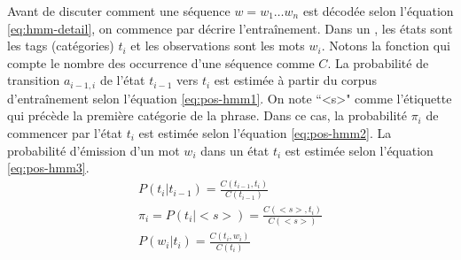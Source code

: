 \documentclass{KodeBook}
\begin{document}
Avant de discuter comment une séquence $w=w_1 \ldots w_n$ est décodée selon l'équation \ref{eq:hmm-detail}, on commence par décrire l'entraînement. 
Dans un , les états sont les tags (catégories) $t_i$ et les observations sont les mots $w_i$. 
Notons la fonction qui compte le nombre des occurrence d'une séquence comme $C$.
La probabilité de transition $a_{i-1,i}$ de l'état $t_{i-1}$ vers $t_i$ est estimée à partir du corpus d'entraînement selon l'équation \ref{eq:pos-hmm1}.
On note ``<s>" comme l'étiquette qui précède la première catégorie de la phrase. 
Dans ce cas, la probabilité $\pi_i$ de commencer par l'état $t_i$ est estimée selon l'équation \ref{eq:pos-hmm2}.
La probabilité d'émission d'un mot $w_i$ dans un état $t_i$ est estimée selon l'équation \ref{eq:pos-hmm3}.
\begin{align}
P(t_i | t_{i-1}) = \frac{C(t_{i-1}, t_i)}{C(t_{i-1})}  \label{eq:pos-hmm1} \\
\pi_i = P(t_i | <s>) = \frac{C(<s>, t_i)}{C(<s>)} \label{eq:pos-hmm2} \\
P(w_i | t_i) = \frac{C(t_i, w_i)}{C(t_i)} \label{eq:pos-hmm3}
\end{align}
\end{document}
